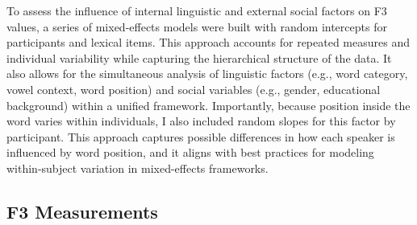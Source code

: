 \documentclass[
  man]{apa6}
\begin{document}
To assess the influence of internal linguistic and external social factors on F3 values, a series of mixed-effects models were built with random intercepts for participants and lexical items. This approach accounts for repeated measures and individual variability while capturing the hierarchical structure of the data. It also allows for the simultaneous analysis of linguistic factors (e.g., word category, vowel context, word position) and social variables (e.g., gender, educational background) within a unified framework. Importantly, because position inside the word varies within individuals, I also included random slopes for this factor by participant. This approach captures possible differences in how each speaker is influenced by word position, and it aligns with best practices for modeling within-subject variation in mixed-effects frameworks.

\subsection{F3 Measurements}\label{f3-measurements}
\end{document}
